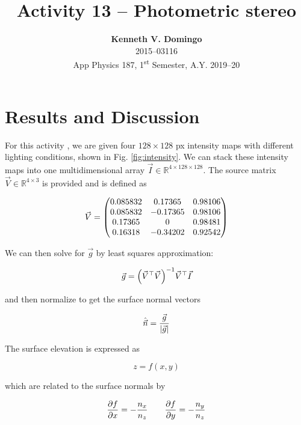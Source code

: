 \documentclass[12pt,a4paper]{article}
\newcommand{\activity}{Activity 13 -- Photometric stereo}
\begin{document}
\title{\TitleFont \activity}
\author[ ]{\textbf{Kenneth V. Domingo} \\
2015--03116 \\
App Physics 187, 1\textsuperscript{st} Semester, A.Y. 2019--20}

\maketitle
\thispagestyle{titlestyle}

\section*{Results and Discussion}
\setcounter{section}{1}

For this activity \cite{soriano}, we are given four $128 \times 128$ px intensity maps with different lighting conditions, shown in Fig. \ref{fig:intensity}. We can stack these intensity maps into one multidimensional array $\vec{I} \in \mathbb{R}^{4 \times 128 \times 128}$. The source matrix $\vec{V} \in \mathbb{R}^{4 \times 3}$ is provided and is defined as

\begin{equation}
	\vec{V} = 
	\mqty(0.085832 &  0.17365 & 0.98106 \\
		  0.085832 & -0.17365 & 0.98106 \\
		  0.17365  &  0		  & 0.98481 \\
		  0.16318  & -0.34202 & 0.92542
	)
\end{equation}

We can then solve for $\vec{g}$ by least squares approximation:

\begin{equation}
	\vec{g} = \qty(\vec{V}^\top \vec{V})^{-1} \vec{V}^\top \vec{I}
\end{equation}

and then normalize to get the surface normal vectors

\begin{equation}
	\hat{\vec{n}} = \frac{\vec{g}}{\abs{\vec{g}}}
\end{equation}

The surface elevation is expressed as

\begin{equation}
	z = f(x,y)
\end{equation}

which are related to the surface normals by

\begin{equation}
	\pdv{f}{x} = -\frac{n_x}{n_z} \qquad \pdv{f}{y} = -\frac{n_y}{n_z}
\end{equation}
\end{document}
